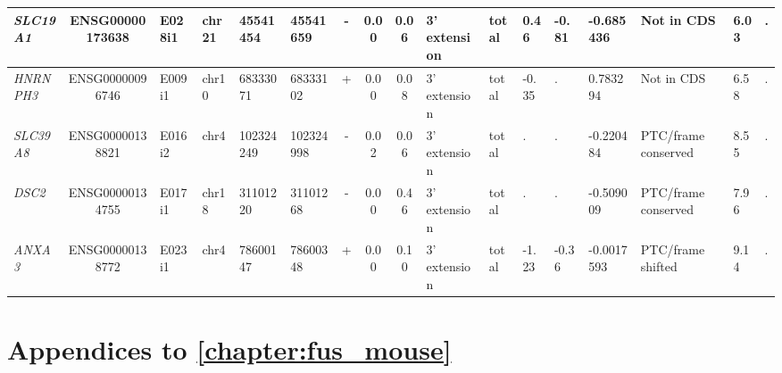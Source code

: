 \begin{appendices}
\begin{landscape}
\begin{table}
{\begin{tabular}{|l|c|l|l|l|l|c|c|c|l|l|l|l|l|l|l|l|}
		\textit{SLC19A1} & ENSG00000173638 & E028i1 & chr21 & 45541454 & 45541659 & -     & 0.00  & 0.06  & 3' extension & total & 0.46  & -0.81 & -0.685436 & Not in CDS     & 6.03  & . \\ \hline
		\textit{HNRNPH3} & ENSG00000096746 & E009i1 & chr10 & 68333071 & 68333102 & +     & 0.00  & 0.08  & 3' extension & total & -0.35 & . & 0.783294 & Not in CDS     & 6.58  & . \\ \hline
		\textit{SLC39A8} & ENSG00000138821 & E016i2 & chr4  & 102324249 & 102324998 & -     & 0.02  & 0.06  & 3' extension & total & . & . & -0.220484 & PTC/frame conserved & 8.55  & . \\ \hline
		\textit{DSC2} & ENSG00000134755 & E017i1 & chr18 & 31101220 & 31101268 & -     & 0.00  & 0.46  & 3' extension & total & . & . & -0.509009 & PTC/frame conserved & 7.96  & . \\ \hline
		\textit{ANXA3} & ENSG00000138772 & E023i1 & chr4  & 78600147 & 78600348 & +     & 0.00  & 0.10  & 3' extension & total & -1.23 & -0.36 & -0.0017593 & PTC/frame shifted & 9.14  & . \\ \hline
	\end{tabular}%
	} 
\end{table}%

\end{landscape}

\addtolength{\abovecaptionskip}{25mm}

\clearpage


\section*{Appendices to \autoref{chapter:fus_mouse} }


\end{appendices}
